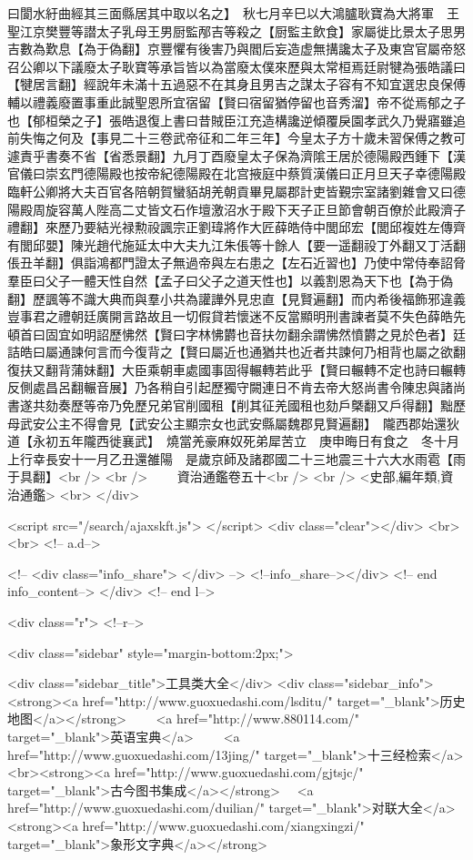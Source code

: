 曰閬水紆曲經其三面縣居其中取以名之】　秋七月辛巳以大鴻臚耿寶為大將軍　王聖江京樊豐等譛太子乳母王男厨監邴吉等殺之【厨監主飲食】家屬徙比景太子思男吉數為歎息【為于偽翻】京豐懼有後害乃與閻后妄造虚無搆讒太子及東宫官屬帝怒召公卿以下議廢太子耿寶等承旨皆以為當廢太僕來歷與太常桓焉廷尉犍為張皓議曰【犍居言翻】經說年未滿十五過惡不在其身且男吉之謀太子容有不知宜選忠良保傅輔以禮義廢置事重此誠聖恩所宜宿留【賢曰宿留猶停留也音秀溜】帝不從焉郁之子也【郁桓榮之子】張皓退復上書曰昔賊臣江充造構讒逆傾覆戾園孝武久乃覺寤雖追前失悔之何及【事見二十三卷武帝征和二年三年】今皇太子方十歲未習保傅之教可遽責乎書奏不省【省悉景翻】九月丁酉廢皇太子保為濟隂王居於德陽殿西鍾下【漢官儀曰崇玄門德陽殿也按帝紀德陽殿在北宫掖庭中蔡質漢儀曰正月旦天子幸德陽殿臨軒公卿將大夫百官各陪朝賀蠻貊胡羌朝貢畢見屬郡計吏皆覲宗室諸劉雜會又曰德陽殿周旋容萬人陛高二丈皆文石作壇激沼水于殿下天子正旦節會朝百僚於此殿濟子禮翻】來歷乃要結光禄勲祋諷宗正劉瑋將作大匠薛皓侍中閭邱宏【閭邱複姓左傳齊有閭邱嬰】陳光趙代施延太中大夫九江朱倀等十餘人【要一遥翻祋丁外翻又丁活翻倀丑羊翻】俱詣鴻都門證太子無過帝與左右患之【左石近習也】乃使中常侍奉詔脅羣臣曰父子一體天性自然【孟子曰父子之道天性也】以義割恩為天下也【為于偽翻】歷諷等不識大典而與羣小共為讙譁外見忠直【見賢遍翻】而内希後福飾邪違義豈事君之禮朝廷廣開言路故且一切假貸若懷迷不反當顯明刑書諫者莫不失色薛皓先頓首曰固宜如明詔歷怫然【賢曰字林怫欝也音扶勿翻余謂怫然憤欝之見於色者】廷詰皓曰屬通諫何言而今復背之【賢曰屬近也通猶共也近者共諫何乃相背也屬之欲翻復扶又翻背蒲妹翻】大臣乘朝車處國事固得輾轉若此乎【賢曰輾轉不定也詩曰輾轉反側處昌呂翻輾音展】乃各稍自引起歷獨守闕連日不肯去帝大怒尚書令陳忠與諸尚書遂共劾奏歷等帝乃免歷兄弟官削國租【削其征羌國租也劾戶槩翻又戶得翻】黜歷母武安公主不得會見【武安公主顯宗女也武安縣屬魏郡見賢遍翻】　隴西郡始還狄道【永初五年隴西徙襄武】　燒當羌豪麻奴死弟犀苦立　庚申晦日有食之　冬十月上行幸長安十一月乙丑還雒陽　是歲京師及諸郡國二十三地震三十六大水雨雹【雨于具翻】<br />
<br />
　　資治通鑑卷五十<br />
<br />
<史部,編年類,資治通鑑>  <br>
   </div> 

<script src="/search/ajaxskft.js"> </script>
 <div class="clear"></div>
<br>
<br>
 <!-- a.d-->

 <!--
<div class="info_share">
</div> 
-->
 <!--info_share--></div>   <!-- end info_content-->
  </div> <!-- end l-->

<div class="r">   <!--r-->



<div class="sidebar"  style="margin-bottom:2px;">

 
<div class="sidebar_title">工具类大全</div>
<div class="sidebar_info">
<strong><a href="http://www.guoxuedashi.com/lsditu/" target="_blank">历史地图</a></strong>　　
<a href="http://www.880114.com/" target="_blank">英语宝典</a>　　
<a href="http://www.guoxuedashi.com/13jing/" target="_blank">十三经检索</a>　
<br><strong><a href="http://www.guoxuedashi.com/gjtsjc/" target="_blank">古今图书集成</a></strong>　
<a href="http://www.guoxuedashi.com/duilian/" target="_blank">对联大全</a>　<strong><a href="http://www.guoxuedashi.com/xiangxingzi/" target="_blank">象形文字典</a></strong>　

